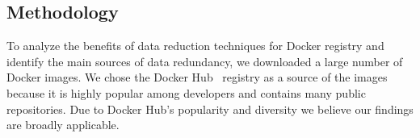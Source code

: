 \subsection{Methodology}
\label{sec:methodology}



%
%

To analyze the benefits of data reduction techniques for Docker registry and
identify the main sources of data redundancy, we downloaded a large number of
Docker images.
%
We chose the Docker Hub~\cite{docker-hub} registry as a source of the images
because it is highly popular among developers and contains many public
repositories.
%
Due to Docker Hub's popularity and diversity
we believe our findings are broadly applicable.

